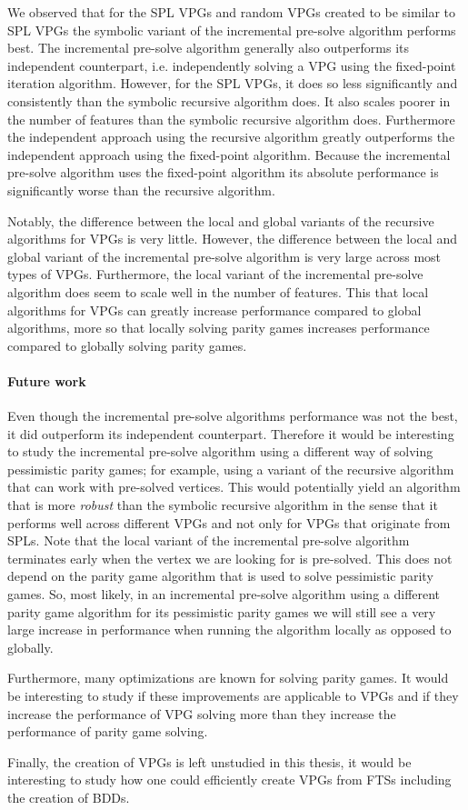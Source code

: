 We observed that for the SPL VPGs and random VPGs created to be similar to SPL VPGs the symbolic variant of the incremental pre-solve algorithm performs best. The incremental pre-solve algorithm generally also outperforms its independent counterpart, i.e. independently solving a VPG using the fixed-point iteration algorithm. However, for the SPL VPGs, it does so less significantly and consistently than the symbolic recursive algorithm does. It also scales poorer in the number of features than the symbolic recursive algorithm does. Furthermore the independent approach using the recursive algorithm greatly outperforms the independent approach using the fixed-point algorithm. Because the incremental pre-solve algorithm uses the fixed-point algorithm its absolute performance is significantly worse than the recursive algorithm.

Notably, the difference between the local and global variants of the recursive algorithms for VPGs is very little. However, the difference between the local and global variant of the incremental pre-solve algorithm is very large across most types of VPGs. Furthermore, the local variant of the incremental pre-solve algorithm does seem to scale well in the number of features. This that local algorithms for VPGs can greatly increase performance compared to global algorithms, more so that locally solving parity games increases performance compared to globally solving parity games.

\paragraph{Future work} Even though the incremental pre-solve algorithms performance was not the best, it did outperform its independent counterpart. Therefore it would be interesting to study the incremental pre-solve algorithm using a different way of solving pessimistic parity games; for example, using a variant of the recursive algorithm that can work with pre-solved vertices. This would potentially yield an algorithm that is more \textit{robust}  than the symbolic recursive algorithm in the sense that it performs well across different VPGs and not only for VPGs that originate from SPLs. Note that the local variant of the incremental pre-solve algorithm terminates early when the vertex we are looking for is pre-solved. This does not depend on the parity game algorithm that is used to solve pessimistic parity games. So, most likely, in an incremental pre-solve algorithm using a different parity game algorithm for its pessimistic parity games we will still see a very large increase in performance when running the algorithm locally as opposed to globally.

Furthermore, many optimizations are known for solving parity games. It would be interesting to study if these improvements are applicable to VPGs and if they increase the performance of VPG solving more than they increase the performance of parity game solving. 

Finally, the creation of VPGs is left unstudied in this thesis, it would be interesting to study how one could efficiently create VPGs from FTSs including the creation of BDDs.